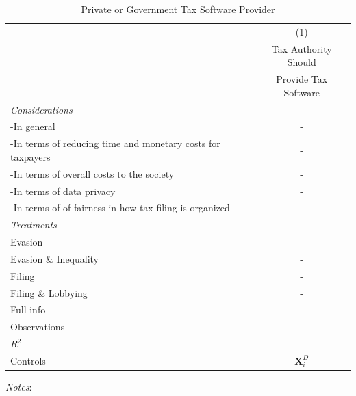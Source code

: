 \documentclass[11pt]{article}
\begin{document}
\begin{table}[!htbp]\centering
\caption{Private or Government Tax Software Provider}
\label{tab:taxsoftwareprovider}
\begin{threeparttable}
\begin{tabular}{l|c}
\toprule
& (1) \\
 & Tax Authority Should \\
 & Provide Tax Software \\
 \midrule
\textit{Considerations} \\[0.25em]
-In general & - \\[0.25em]
-In terms of reducing time and monetary costs for taxpayers & - \\[0.25em]
-In terms of overall costs to the society & - \\[0.25em]
-In terms of data privacy & - \\[0.25em]
-In terms of of fairness in how tax filing is organized & -\\[1em]
\textit{Treatments} \\[0.25em]
Evasion        & - \\[0.25em]
Evasion \& Inequality    & - \\[0.25em]
Filing             & - \\[0.25em]
Filing \& Lobbying            & - \\[0.25em]
Full info               & - \\

\midrule
Observations                        &-       \\
$R^2$                               &-    \\
Controls                 & $\mathbf{X}_{i}^{D}$      \\
\bottomrule
\end{tabular}
\begin{tablenotes}[flushleft]
\footnotesize
\item \textit{Notes}:   
\end{tablenotes}
\end{threeparttable}
\end{table} 
\end{document}
